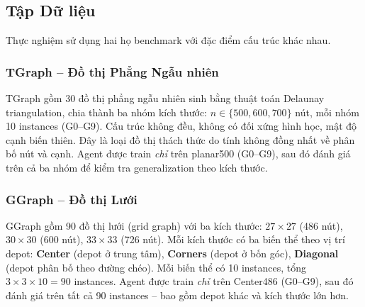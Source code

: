 \documentclass[12pt, a4paper]{article}
\begin{document}
\subsection{Tập Dữ liệu}

Thực nghiệm sử dụng hai họ benchmark với đặc điểm cấu trúc khác nhau.

\subsubsection{TGraph -- Đồ thị Phẳng Ngẫu nhiên}

TGraph gồm 30 đồ thị phẳng ngẫu nhiên sinh bằng thuật toán Delaunay triangulation,
chia thành ba nhóm kích thước: $n \in \{500, 600, 700\}$ nút, mỗi nhóm 10 instances
(G0--G9). Cấu trúc không đều, không có đối xứng hình học, mật độ cạnh biến thiên.
Đây là loại đồ thị thách thức do tính không đồng nhất về phân bố nút và cạnh.
Agent được train \emph{chỉ} trên planar500 (G0--G9), sau đó đánh giá trên cả ba
nhóm để kiểm tra generalization theo kích thước.

\subsubsection{GGraph -- Đồ thị Lưới}

GGraph gồm 90 đồ thị lưới (grid graph) với ba kích thước:
$27\!\times\!27$ (486 nút), $30\!\times\!30$ (600 nút), $33\!\times\!33$ (726 nút).
Mỗi kích thước có ba biến thể theo vị trí depot:
\textbf{Center} (depot ở trung tâm), \textbf{Corners} (depot ở bốn góc),
\textbf{Diagonal} (depot phân bố theo đường chéo).
Mỗi biến thể có 10 instances, tổng $3 \times 3 \times 10 = 90$ instances.
Agent được train \emph{chỉ} trên Center486 (G0--G9), sau đó đánh giá trên tất cả
90 instances -- bao gồm depot khác và kích thước lớn hơn.
\end{document}
